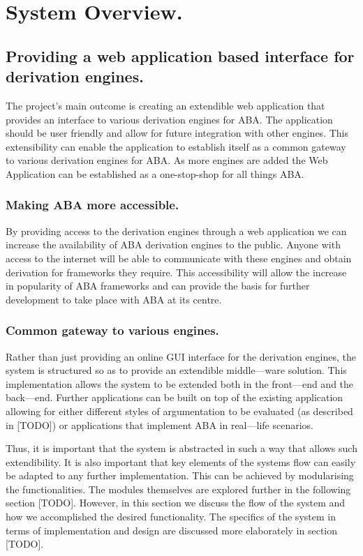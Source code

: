 \newpage	

\chapter{System Overview.}

\section{Providing a web application based interface for derivation engines.}
The project's main outcome is creating an extendible web application that provides an interface to various derivation engines for ABA. The application should be user friendly and allow for future integration with other engines. This extensibility can enable the application to establish itself as a common gateway to various derivation engines for ABA. As more engines are added the Web Application can be established as a one-stop-shop for all things ABA.

\subsection{Making ABA more accessible.}
By providing access to the derivation engines through a web application we can increase the availability of ABA derivation engines to the public. Anyone with access to the internet will be able to communicate with these engines and obtain derivation for frameworks they require. This accessibility will allow the increase in popularity of ABA frameworks and can provide the basis for further development to take place with ABA at its centre.

\subsection{Common gateway to various engines.}
Rather than just providing an online GUI interface for the derivation engines, the system is structured so as to provide an extendible middle---ware solution. This implementation allows the system to be extended both in the front---end and the back---end. Further applications can be built on top of the existing application allowing for either different styles of argumentation to be evaluated (as described in [TODO]) or applications that implement ABA in real---life scenarios.

Thus, it is important that the system is abstracted in such a way that allows such extendibility. It is also important that key elements of the systems flow can easily be adapted to any further implementation. This can be achieved by modularising the functionalities. The modules themselves are explored further in the following section [TODO]. However, in this section we discuss the flow of the system and how we accomplished the desired functionality. The specifics of the system in terms of implementation and design are discussed more elaborately in section [TODO].

